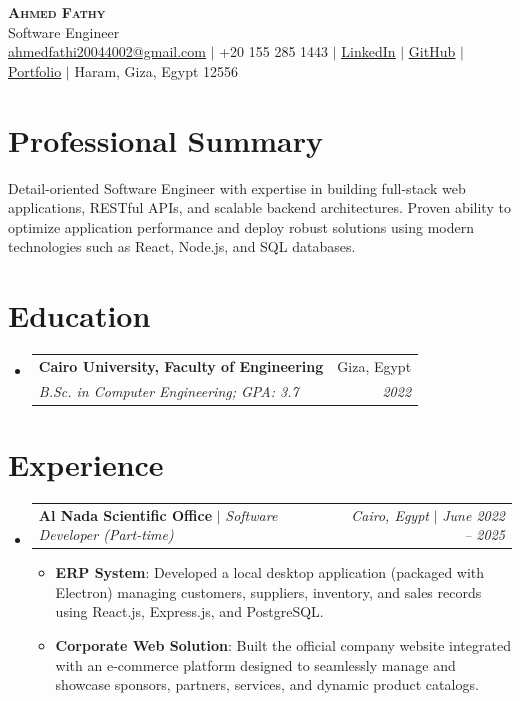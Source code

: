 \documentclass[letterpaper,11pt]{article}
\makeatletter
\newcommand{\resumeItem}[2]{\item\small{\textbf{#1}{: #2 \vspace{-2pt}}}}
\newcommand{\resumeSubheading}[4]{
  \vspace{-1pt}\item
    \begin{tabular*}{0.97\textwidth}{l@{\extracolsep{\fill}}r}
      \textbf{#1} & #2 \\
      \textit{\small#3} & \textit{\small #4} \\
    \end{tabular*}\vspace{-5pt}
}
\newcommand{\resumeActivitySubheading}[4]{
  \vspace{-1pt}\item
    \begin{tabular*}{0.97\textwidth}{l@{\extracolsep{\fill}}r}
      \textbf{#1} $|$ \textit{\small#3} & \textit{\small#2} $|$ \textit{\small #4} \\
    \end{tabular*}\vspace{-5pt}
}
\newcommand{\resumeSubHeadingListStart}{\begin{itemize}[leftmargin=*]}
\newcommand{\resumeSubHeadingListEnd}{\end{itemize}}
\newcommand{\resumeItemListStart}{\begin{itemize}}
\newcommand{\resumeItemListEnd}{\end{itemize}\vspace{-5pt}}
\makeatother
\begin{document}
\begin{center}
    \textbf{\Huge \scshape Ahmed Fathy} \\ \vspace{1pt}
    \small Software Engineer \\
    \href{mailto:ahmedfathi20044002@gmail.com}{\underline{ahmedfathi20044002@gmail.com}} $|$
    +20 155 285 1443 $|$
    \href{https://www.linkedin.com/in/ahmedfathy-x1}{\underline{LinkedIn}} $|$
    \href{https://github.com/ahmedfathy0-0}{\underline{GitHub}} $|$
    \href{https://www.mrfathi.tech/}{\underline{Portfolio}} $|$
    Haram, Giza, Egypt 12556
\end{center}


\section{Professional Summary}
  \small Detail-oriented Software Engineer with expertise in building full-stack web applications, RESTful APIs, and scalable backend architectures. Proven ability to optimize application performance and deploy robust solutions using modern technologies such as React, Node.js, and SQL databases.
  \vspace{8pt}
\section{Education}
  \resumeSubHeadingListStart
    \resumeSubheading
      {Cairo University, Faculty of Engineering}{Giza, Egypt}
      {B.Sc. in Computer Engineering;  GPA: 3.7}{2022}
  \resumeSubHeadingListEnd
\section{Experience}
  \resumeSubHeadingListStart
    \resumeActivitySubheading
      {Al Nada Scientific Office}{Cairo, Egypt}{Software Developer (Part-time)}{June 2022 -- 2025}
      \resumeItemListStart
        \resumeItem{ERP System}
          {Developed a local desktop application (packaged with Electron) managing customers, suppliers, inventory, and sales records using React.js, Express.js, and PostgreSQL.}
        \resumeItem{Corporate Web Solution}
          {Built the official company website integrated with an e-commerce platform designed to seamlessly manage and showcase sponsors, partners, services, and dynamic product catalogs.}
      \resumeItemListEnd
  \resumeSubHeadingListEnd
\end{document}
